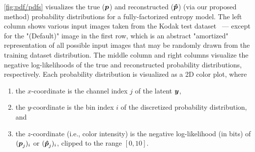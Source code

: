\cref{fig:pdf/pdfs} visualizes the true (${\boldsymbol{p}}$) and reconstructed (${\boldsymbol{\hat{p}}}$) (via our proposed method) probability distributions for a fully-factorized entropy model.
The left column shows various input images taken from the Kodak test dataset~\cite{kodak_dataset} --- except for the "(Default)" image in the first row, which is an abstract "amortized" representation of all possible input images that may be randomly drawn from the training dataset distribution.
The middle column and right columns visualize the negative log-likelihoods of the true and reconstructed probability distributions, respectively.
Each probability distribution is visualized as a 2D color plot, where
\begin{enumerate}[label=(\roman*), noitemsep, topsep=0pt]
  \item the $x$-coordinate is the channel index $j$ of the latent ${\boldsymbol{y}}$,
  \item the $y$-coordinate is the bin index $i$ of the discretized probability distribution, and
  \item the $z$-coordinate (i.e., color intensity) is the negative log-likelihood (in bits) of $({\boldsymbol{p}}_j)_i$ or $({\boldsymbol{\hat{p}}}_j)_i$, clipped to the range $[0, 10]$.
\end{enumerate}


